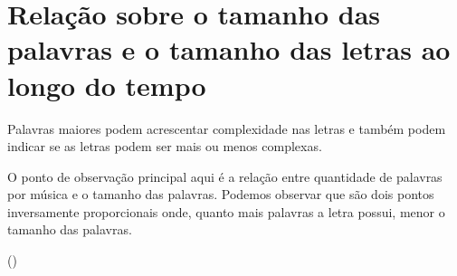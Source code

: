 \documentclass[]{article}
\begin{document}
\hypertarget{relacao-sobre-o-tamanho-das-palavras-e-o-tamanho-das-letras-ao-longo-do-tempo}{%
\section{Relação sobre o tamanho das palavras e o tamanho das letras ao
longo do
tempo}\label{relacao-sobre-o-tamanho-das-palavras-e-o-tamanho-das-letras-ao-longo-do-tempo}}

Palavras maiores podem acrescentar complexidade nas letras e também
podem indicar se as letras podem ser mais ou menos complexas.

O ponto de observação principal aqui é a relação entre quantidade de
palavras por música e o tamanho das palavras. Podemos observar que são
dois pontos inversamente proporcionais onde, quanto mais palavras a
letra possui, menor o tamanho das palavras.

()
\end{document}

